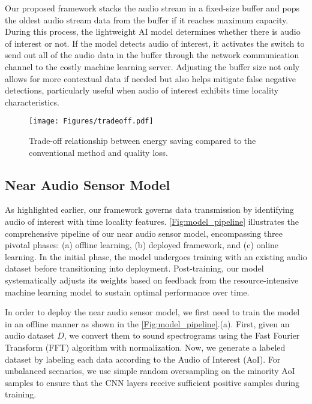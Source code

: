 Our proposed framework stacks the audio stream in a fixed-size buffer and pops the oldest audio stream data from the buffer if it reaches maximum capacity. During this process, the lightweight AI model determines whether there is audio of interest or not. If the model detects audio of interest, it activates the switch to send out all of the audio data in the buffer through the network communication channel to the costly machine learning server. Adjusting the buffer size not only allows for more contextual data if needed but also helps mitigate false negative detections, particularly useful when audio of interest exhibits time locality characteristics.




\begin{figure*}
    \centering    \texttt{[image: Figures/tradeoff.pdf]}
    \caption{Trade-off relationship between energy saving compared to the conventional method and quality loss.}
    \label{fig:tradeoff}
\end{figure*}


\subsection{Near Audio Sensor Model}

As highlighted earlier, our framework governs data transmission by identifying audio of interest with time locality features. \autoref{Fig:model_pipeline} illustrates the comprehensive pipeline of our near audio sensor model, encompassing three pivotal phases: (a) offline learning, (b) deployed framework, and (c) online learning. In the initial phase, the model undergoes training with an existing audio dataset before transitioning into deployment. Post-training, our model systematically adjusts its weights based on feedback from the resource-intensive machine learning model to sustain optimal performance over time.

In order to deploy the near audio sensor model, we first need to train the model in an offline manner as shown in the \autoref{Fig:model_pipeline}.(a). First, given an audio dataset $D$, we convert them to sound spectrograms using the Fast Fourier Transform (FFT) algorithm with normalization. Now, we generate a labeled dataset by labeling each data according to the Audio of Interest (AoI). For unbalanced scenarios, we use simple random oversampling on the minority AoI samples to ensure that the CNN layers receive sufficient positive samples during training.

